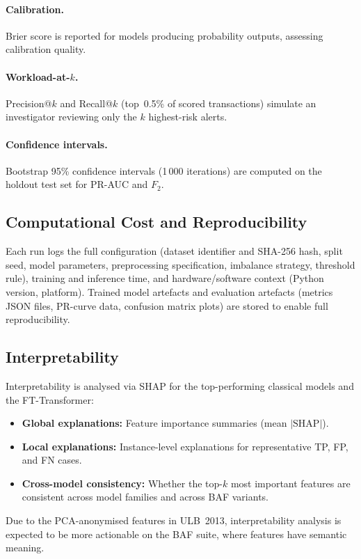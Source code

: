 \paragraph{Calibration.}
Brier score is reported for models producing probability outputs, assessing calibration quality.

\paragraph{Workload-at-$k$.}
Precision@$k$ and Recall@$k$ (top~0.5\% of scored transactions) simulate an investigator reviewing only the $k$ highest-risk alerts.

\paragraph{Confidence intervals.}
Bootstrap 95\% confidence intervals (1\,000 iterations) are computed on the holdout test set for PR-AUC and $F_2$.

\subsection{Computational Cost and Reproducibility}
\label{sec:reproducibility}

Each run logs the full configuration (dataset identifier and SHA-256 hash, split seed, model parameters, preprocessing specification, imbalance strategy, threshold rule), training and inference time, and hardware/software context (Python version, platform). Trained model artefacts and evaluation artefacts (metrics JSON files, PR-curve data, confusion matrix plots) are stored to enable full reproducibility.

\subsection{Interpretability}
\label{sec:interpretability}

Interpretability is analysed via SHAP for the top-performing classical models and the FT-Transformer:
\begin{itemize}
  \item \textbf{Global explanations:} Feature importance summaries (mean $|\text{SHAP}|$).
  \item \textbf{Local explanations:} Instance-level explanations for representative TP, FP, and FN cases.
  \item \textbf{Cross-model consistency:} Whether the top-$k$ most important features are consistent across model families and across BAF variants.
\end{itemize}

Due to the PCA-anonymised features in ULB~2013, interpretability analysis is expected to be more actionable on the BAF suite, where features have semantic meaning.
